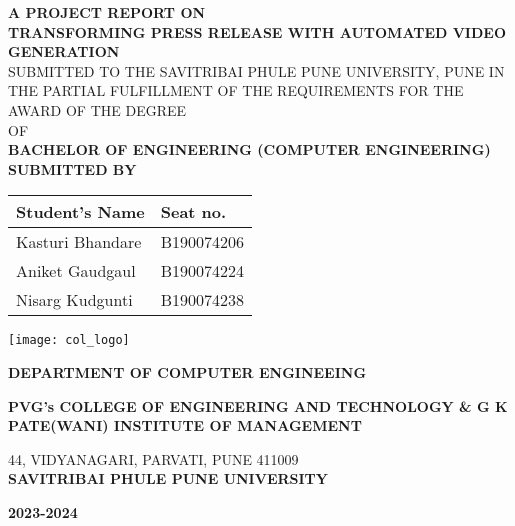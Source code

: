 \documentclass[12pt]{article}
\begin{document}


\noindent

\noindent

\noindent

\noindent  

\noindent

\noindent  

\noindent

\noindent

\noindent  

\noindent

\begin{center}
\fontsize{12}{12}\textbf{A PROJECT REPORT ON} \linebreak
\\
\fontsize{16}{16}\textbf{TRANSFORMING PRESS RELEASE WITH AUTOMATED VIDEO GENERATION}
\bigskip
\\
\fontsize{12}{12}SUBMITTED TO THE SAVITRIBAI PHULE PUNE UNIVERSITY, PUNE IN THE PARTIAL FULFILLMENT OF THE REQUIREMENTS FOR THE AWARD OF THE DEGREE\\
\medskip
\fontsize{12}{12}OF
\bigskip
\\
\fontsize{16}{16}\textbf{BACHELOR OF ENGINEERING (COMPUTER ENGINEERING)
}
\linebreak
\\
\fontsize{12}{12}\textbf{SUBMITTED BY}\\

\bigskip
\vspace{5mm}
\begin{tabular}{|l|l|}
\hline
Student's Name       & Seat no. \\
\hline
Kasturi Bhandare    & B190074206 \\
\hline
Aniket Gaudgaul      &  B190074224\\
\hline
Nisarg Kudgunti & B190074238 \\
\hline

\end{tabular}

\bigskip

\bigskip

\noindent \texttt{[image: col\_logo]}

\bigskip
\fontsize{16}{16}\textbf{DEPARTMENT OF COMPUTER ENGINEEING} \linebreak

\bigskip
\fontsize{12}{12}\textbf{PVG’s COLLEGE OF ENGINEERING AND TECHNOLOGY \& G K PATE(WANI) INSTITUTE OF MANAGEMENT} \linebreak

\fontsize{12}{12} 44, VIDYANAGARI, PARVATI, PUNE 411009 \\
\bigskip
\fontsize{12}{12} \textbf{SAVITRIBAI PHULE PUNE UNIVERSITY} \linebreak


\textbf{2023-2024}


\medskip
\vspace{5mm}
\end{center}
\end{document}
